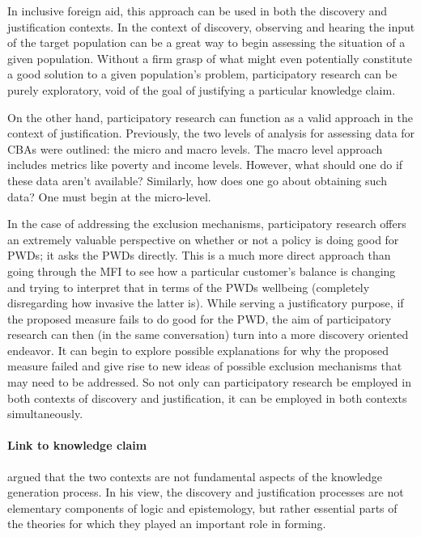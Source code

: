 \documentclass[a4paper]{article}
\begin{document}
In inclusive foreign aid, this approach can be used in both the discovery and
justification contexts. In the context of discovery, observing and hearing the
input of the target population can be a great way to begin assessing the
situation of a given population. Without a firm grasp of what might even
potentially constitute a good solution to a given population's problem,
participatory research can be purely exploratory, void of the goal of
justifying a particular knowledge claim.

On the other hand, participatory research can function as a valid approach in
the context of justification. Previously, the two levels of analysis for
assessing data for CBAs were outlined: the micro and macro levels. The macro
level approach includes metrics like poverty and income levels. However, what
should one do if these data aren't available? Similarly, how does one go about
obtaining such data? One must begin at the micro-level.

In the case of addressing the exclusion mechanisms, participatory research
offers an extremely valuable perspective on whether or not a policy is doing
good for PWDs; it asks the PWDs directly. This is a much more direct approach
than going through the MFI to see how a particular customer's balance is
changing and trying to interpret that in terms of the PWDs wellbeing
(completely disregarding how invasive the latter is). While serving a
justificatory purpose, if the proposed measure fails to do good for the PWD,
the aim of participatory research can then (in the same conversation) turn
into a more discovery oriented endeavor. It can begin to explore possible
explanations for why the proposed measure failed and give rise to new ideas of
possible exclusion mechanisms that may need to be addressed. So not only can
participatory research be employed in both contexts of discovery and
justification, it can be employed in both contexts simultaneously.


\paragraph{Link to knowledge claim}

\cite{kuhn2012structure} argued that the two contexts are not fundamental
aspects of the knowledge generation process. In his view, the discovery and
justification processes are not elementary components of logic and
epistemology, but rather essential parts of the theories for which they played
an important role in forming.
\end{document}
